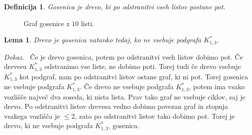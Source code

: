 \documentclass[a4paper, 12pt]{book}
\newtheorem{definicija}{Definicija}[chapter]
\newtheorem{lema}{Lema}[chapter]
\newenvironment{dokaz}{\emph{Dokaz.}\ }{\hspace{\fill}{$\Box$}}
\begin{document}
\begin{definicija}
    Gosenica je drevo, ki po odstranitvi vseh listov postane pot.
\end{definicija}

\begin{figure}[h]
    \begin{center}        
    \end{center}
    \caption{Graf gosenice z $10$ listi.}
    \label{graf_gosenice_10_listov}
\end{figure}


\begin{lema}
\label{lema_gosenica_ne_vsebuje_k13}
    Drevo je gosenica natanko tedaj, ko ne vsebuje podgrafa $K_{1,3}^*$.
\end{lema}
\begin{dokaz}
    Če je drevo gosenica, potem po odstranitvi vseh listov dobimo pot. Če drevesu $K_{1,3}^*$ odstranimo vse liste, ne dobimo poti. Torej tudi če drevo vsebuje $K_{1,3}^*$ kot podgraf, nam po odstranitvi listov ostane graf, ki ni pot. Torej gosenica ne vsebuje podgrafa $K_{1,3}^*$. Če drevo ne vsebuje podgrafa $K_{1,3}^*$, potem ima vsako vozlišče največ dva soseda, ki nista lista. Prav tako graf ne vsebuje ciklov, saj je drevo. Po odstranitvi listov drevesa vedno dobimo povezan graf in stopnja vsakega vozlišča je $\leq 2$, zato po odstranitvi listov tako dobimo pot. Torej je drevo, ki ne vsebuje podgrafa $K_{1,3}^*$, gosenica.
\end{dokaz}
\end{document}
